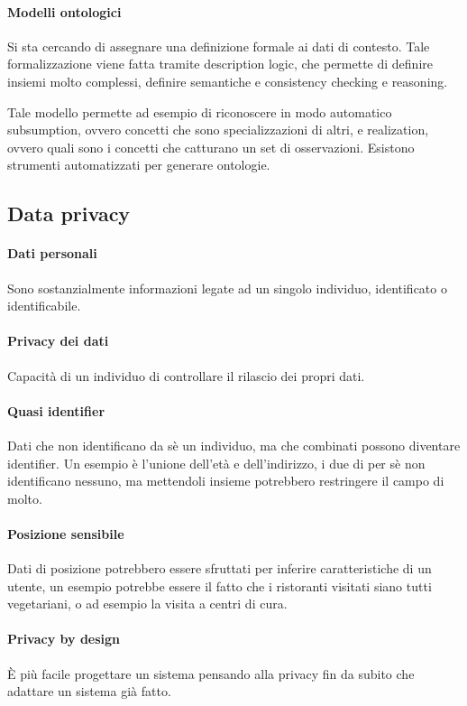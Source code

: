 \paragraph{Modelli ontologici}
Si sta cercando di assegnare una definizione formale ai dati di contesto.
Tale formalizzazione viene fatta tramite description logic, 
che permette di definire insiemi molto complessi, definire semantiche 
e consistency checking e reasoning.

Tale modello permette ad esempio di riconoscere in modo automatico 
subsumption, ovvero concetti che sono specializzazioni di altri, 
e realization, ovvero quali sono i concetti che catturano 
un set di osservazioni.
Esistono strumenti automatizzati per generare ontologie.

\subsection{Data privacy}

\paragraph{Dati personali}
Sono sostanzialmente informazioni legate ad un singolo individuo, 
identificato o identificabile.

\paragraph{Privacy dei dati}
Capacità di un individuo di controllare il rilascio dei propri dati.

\paragraph{Quasi identifier}
Dati che non identificano da sè un individuo, ma che combinati possono 
diventare identifier. Un esempio è l'unione dell'età e dell'indirizzo, 
i due di per sè non identificano nessuno, ma mettendoli insieme 
potrebbero restringere il campo di molto.

\paragraph{Posizione sensibile}
Dati di posizione potrebbero essere sfruttati per inferire caratteristiche di un utente, un esempio potrebbe 
essere il fatto che i ristoranti visitati siano tutti 
vegetariani, o ad esempio la visita a centri di cura.

\paragraph{Privacy by design}
È più facile progettare un sistema pensando alla privacy fin da subito che 
adattare un sistema già fatto.


